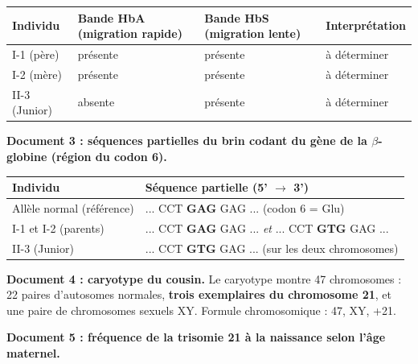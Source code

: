 \documentclass[11pt]{article}
\begin{document}
\begin{center}
\begin{tabularx}{\linewidth}{|l|X|X|X|}
\hline
\rowcolor{popblueL} \textbf{Individu} & \textbf{Bande HbA} (migration rapide) & \textbf{Bande HbS} (migration lente) & \textbf{Interprétation} \\
\hline
I-1 (père) & présente & présente & à déterminer \\
\hline
I-2 (mère) & présente & présente & à déterminer \\
\hline
II-3 (Junior) & absente & présente & à déterminer \\
\hline
\end{tabularx}
\end{center}

\textbf{Document 3 : séquences partielles du brin codant du gène de la $\beta$-globine (région du codon 6).}

\begin{center}
\begin{tabularx}{\linewidth}{|l|X|}
\hline
\rowcolor{popblueL} \textbf{Individu} & \textbf{Séquence partielle (5' $\rightarrow$ 3')} \\
\hline
Allèle normal (référence) & ... CCT \textbf{GAG} GAG ... (codon 6 = Glu) \\
\hline
I-1 et I-2 (parents) & ... CCT \textbf{GAG} GAG ... \emph{et} ... CCT \textbf{GTG} GAG ... \\
\hline
II-3 (Junior) & ... CCT \textbf{GTG} GAG ... (sur les deux chromosomes) \\
\hline
\end{tabularx}
\end{center}

\textbf{Document 4 : caryotype du cousin.} Le caryotype montre 47 chromosomes : 22 paires d'autosomes normales, \textbf{trois exemplaires du chromosome 21}, et une paire de chromosomes sexuels XY. Formule chromosomique : 47, XY, +21.

\textbf{Document 5 : fréquence de la trisomie 21 à la naissance selon l'âge maternel.}
\end{document}
